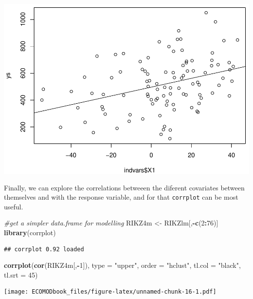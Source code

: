 \documentclass[
]{book}
\newenvironment{Shaded}{\begin{snugshade}}{\end{snugshade}}
\newcommand{\AttributeTok}[1]{\textcolor[rgb]{0.13,0.29,0.53}{#1}}
\newcommand{\CommentTok}[1]{\textcolor[rgb]{0.56,0.35,0.01}{\textit{#1}}}
\newcommand{\DecValTok}[1]{\textcolor[rgb]{0.00,0.00,0.81}{#1}}
\newcommand{\FunctionTok}[1]{\textcolor[rgb]{0.13,0.29,0.53}{\textbf{#1}}}
\newcommand{\NormalTok}[1]{#1}
\newcommand{\OtherTok}[1]{\textcolor[rgb]{0.56,0.35,0.01}{#1}}
\newcommand{\SpecialCharTok}[1]{\textcolor[rgb]{0.81,0.36,0.00}{\textbf{#1}}}
\newcommand{\StringTok}[1]{\textcolor[rgb]{0.31,0.60,0.02}{#1}}
\begin{document}
\includegraphics{ECOMODbook_files/figure-latex/unnamed-chunk-15-1.pdf}

Finally, we can explore the correlations betweeen the diferent covariates between themselves and with the response variable, and for that \texttt{corrplot} can be most useful.

\begin{Shaded}
\begin{Highlighting}[]
\CommentTok{\#get a simpler data.frame for modelling}
\NormalTok{RIKZ4m }\OtherTok{\textless{}{-}}\NormalTok{ RIKZlm[,}\SpecialCharTok{{-}}\FunctionTok{c}\NormalTok{(}\DecValTok{2}\SpecialCharTok{:}\DecValTok{76}\NormalTok{)]}
\FunctionTok{library}\NormalTok{(corrplot)}
\end{Highlighting}
\end{Shaded}

\begin{verbatim}
## corrplot 0.92 loaded
\end{verbatim}

\begin{Shaded}
\begin{Highlighting}[]
\FunctionTok{corrplot}\NormalTok{(}\FunctionTok{cor}\NormalTok{(RIKZ4m[,}\SpecialCharTok{{-}}\DecValTok{1}\NormalTok{]), }\AttributeTok{type =} \StringTok{"upper"}\NormalTok{, }\AttributeTok{order =} \StringTok{"hclust"}\NormalTok{, }\AttributeTok{tl.col =} \StringTok{"black"}\NormalTok{, }\AttributeTok{tl.srt =} \DecValTok{45}\NormalTok{)}
\end{Highlighting}
\end{Shaded}

\texttt{[image: ECOMODbook\_files/figure-latex/unnamed-chunk-16-1.pdf]}
\end{document}
